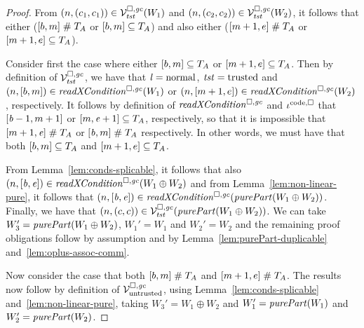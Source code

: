 \begin{proof}
  From $\left(n,(c_1,c_1)\right) \in \mathcal{V}^{\square,\mathit{gc}}_{\mathit{tst}}(W_1)$ and $\left(n,(c_2,c_2)\right) \in \mathcal{V}^{\square,\mathit{gc}}_{\mathit{tst}}(W_2)$, it follows that either ($[b,m] \mathrel{\#} T_{A}$ or $[b,m] \subseteq T_{A}$) and also either ($[m+1,e] \mathrel{\#} T_{A}$ or $[m+1,e] \subseteq T_{A}$).

  Consider first the case where either $[b,m] \subseteq T_{A}$ or $[m+1,e]\subseteq T_{A}$.
  Then by definition of $\mathcal{V}^{\square,\mathit{gc}}_{\mathit{tst}}$, we have that $\mathit{l} = \mathrm{normal}$, $\mathit{tst} = \mathrm{trusted}$ and $\npair{[b,m]} \in \xReadCond{W_1}$ or $\npair{[m+1,e]} \in \xReadCond{W_2}$, respectively.
  It follows by definition of $\xReadCond{}$ and $\iota^{\mathrm{code},\square}_{}$ that $[\mathit{b}-1,m+1]$ or $[m,\mathit{e}+1] \subseteq T_{A}$, respectively, so that it is impossible that $[m+1,\mathit{e}]\mathrel{\#} T_{A}$ or $[\mathit{b},m] \mathrel{\#} T_{A}$ respectively.
  In other words, we must have that both $[b,m] \subseteq T_{A}$ and $[m+1,e]\subseteq T_{A}$.

  From Lemma~\ref{lem:conds-splicable}, it follows that also $\npair{[\baddr,\eaddr]}\in\xReadCond{W_1\oplus W_2}$ and from Lemma~\ref{lem:non-linear-pure}, it follows that $\npair{[\baddr,\eaddr]}\in\xReadCond{}(\purePart{W_1\oplus W_2})$.
  Finally, we have that $\npair{(c,c)}\in\lrvg{\trust}(\purePart{W_1\oplus W_2})$.
  We can take $W_3' = \purePart{W_1\oplus W_2}$, $W_1' = W_1$ and $W_2' = W_2$ and the remaining proof obligations follow by assumption and by Lemma~\ref{lem:purePart-duplicable} and~\ref{lem:oplus-assoc-comm}.
  
  Now consider the case that both $[b,m] \mathrel{\#} T_{A}$ and $[m+1,e]\mathrel{\#} T_{A}$.
  The results now follow by definition of $\mathcal{V}^{\square,\mathit{gc}}_{\mathrm{untrusted}}$, using Lemma~\ref{lem:conds-splicable} and~\ref{lem:non-linear-pure}, taking $W_3' = W_1 \oplus W_2$ and $W_1' = \purePart{W_1}$ and $W_2' = \purePart{W_2}$.
\end{proof}

